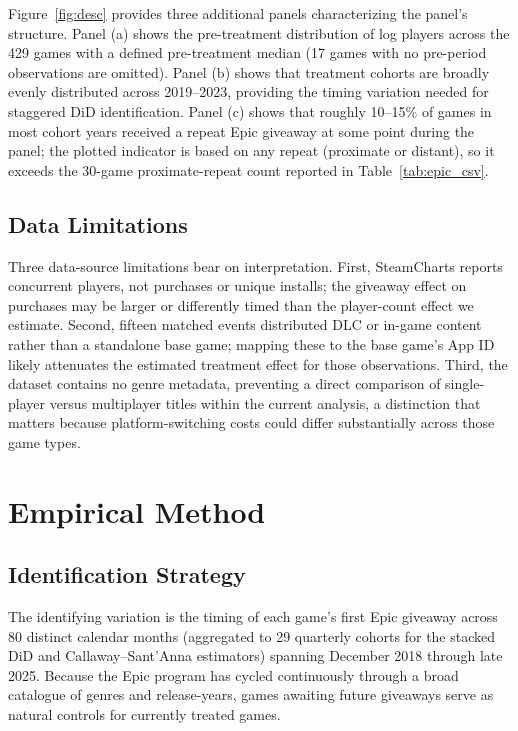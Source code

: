 \documentclass[11pt]{article}
\begin{document}
Figure~\ref{fig:desc} provides three additional panels characterizing the panel's
structure. Panel (a) shows the pre-treatment distribution of log players across
the 429 games with a defined pre-treatment median (17 games with no pre-period
observations are omitted). Panel (b) shows that treatment cohorts are
broadly evenly distributed across 2019--2023, providing the timing variation needed
for staggered DiD identification. Panel (c) shows that roughly 10--15\% of games
in most cohort years received a repeat Epic giveaway at some point during the
panel; the plotted indicator is based on any repeat (proximate or distant), so
it exceeds the 30-game proximate-repeat count reported in
Table~\ref{tab:epic_csv}.

\subsection{Data Limitations}

Three data-source limitations bear on interpretation. First, SteamCharts reports
concurrent players, not purchases or unique installs; the giveaway effect on purchases
may be larger or differently timed than the player-count effect we estimate. Second,
fifteen matched events distributed DLC or in-game content rather than a standalone
base game; mapping these to the base game's App ID likely attenuates the estimated
treatment effect for those observations. Third, the dataset contains no genre
metadata, preventing a direct comparison of single-player versus multiplayer titles
within the current analysis, a distinction that matters because platform-switching
costs could differ substantially across those game types.

\section{Empirical Method}
\label{sec:method}

\subsection{Identification Strategy}

The identifying variation is the timing of each game's first Epic giveaway
across 80 distinct calendar months (aggregated to 29 quarterly cohorts for the
stacked DiD and Callaway--Sant'Anna estimators) spanning December 2018 through
late 2025. Because
the Epic program has cycled continuously through a broad catalogue of genres and
release-years, games awaiting future giveaways serve as natural controls for currently
treated games. 
\end{document}
